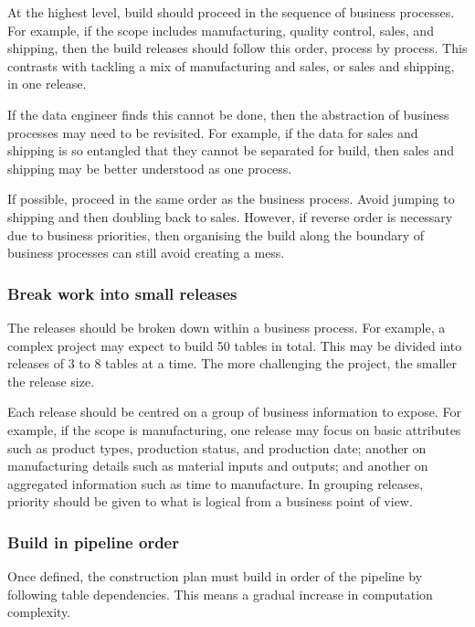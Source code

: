\documentclass[10pt,openany,10pt]{book}
\begin{document}
At the highest level, build should proceed in the sequence of business
processes. For example, if the scope includes manufacturing, quality
control, sales, and shipping, then the build releases should follow this
order, process by process. This contrasts with tackling a mix of
manufacturing and sales, or sales and shipping, in one release.

If the data engineer finds this cannot be done, then the abstraction of
business processes may need to be revisited. For example, if the data
for sales and shipping is so entangled that they cannot be separated for
build, then sales and shipping may be better understood as one process.

If possible, proceed in the same order as the business process. Avoid
jumping to shipping and then doubling back to sales. However, if reverse
order is necessary due to business priorities, then organising the build
along the boundary of business processes can still avoid creating a
mess.

\subsubsection{Break work into small
releases}\label{break-work-into-small-releases}

The releases should be broken down within a business process. For
example, a complex project may expect to build 50 tables in total. This
may be divided into releases of 3 to 8 tables at a time. The more
challenging the project, the smaller the release size.

Each release should be centred on a group of business information to
expose. For example, if the scope is manufacturing, one release may
focus on basic attributes such as product types, production status, and
production date; another on manufacturing details such as material
inputs and outputs; and another on aggregated information such as time
to manufacture. In grouping releases, priority should be given to what
is logical from a business point of view.

\subsubsection{Build in pipeline order}\label{build-in-pipeline-order}

Once defined, the construction plan must build in order of the pipeline
by following table dependencies. This means a gradual increase in
computation complexity.
\end{document}
